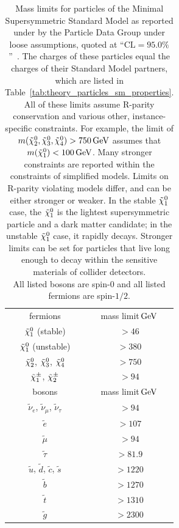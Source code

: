\begin{table}[tp]
\centering
\begin{tabular}{cc}
fermions                                        & mass limit$\,\eV[G]$ \\[0.2em]
$\neutralino_1$ (stable)                        & $> 46$         \\
$\neutralino_1$ (unstable)                      & $> 380$        \\
$\neutralino_2$, $\neutralino_3$, $\neutralino_4$ & $> 750$        \\
$\chargino_1$, $\chargino_2$                     & $> 94$         \\[1em]
bosons                                          & mass limit$\,\eV[G]$ \\[0.2em]
$\tilde \nu_e$, $\tilde \nu_\mu$, $\tilde \nu_\tau$ & $> 94$       \\
$\tilde e$                                      & $> 107$        \\
$\tilde \mu$                                    & $> 94$         \\
$\tilde \tau$                                   & $> 81.9$       \\
$\tilde u$, $\tilde d$, $\tilde c$, $\tilde s$     & $> 1220$       \\
$\tilde b$                                      & $> 1270$       \\
$\tilde t$                                      & $> 1310$       \\
$\tilde g$                                      & $> 2300$
\end{tabular}
\caption[%
Mass limits for particles of the Minimal Supersymmetric Standard Model%
]{%
Mass limits for particles of the Minimal Supersymmetric Standard Model as
reported under by the Particle Data Group under loose
assumptions, quoted at ``$\mathrm{CL}=95.0\%$''~\cite{pdg2022ynf}.
The charges of these particles equal the charges of their Standard Model
partners, which are listed in
Table~\ref{tab:theory_particles_sm_properties}.
\\[0.4em]
All of these limits assume R-parity conservation and various other,
instance-specific constraints.
For example, the limit of
$m(\neutralino_2,\neutralino_3,\neutralino_4) > 750\,\eV[G]$
assumes that $m(\neutralino_1) < 100\,\eV[G]$.
Many stronger constraints are reported within the constraints of simplified
models.
Limits on R-parity violating models differ, and can be either stronger or
weaker.
In the stable $\neutralino_1$ case, the $\neutralino_1$ is the lightest
supersymmetric particle and a dark matter candidate;
in the unstable $\neutralino_1$ case, it rapidly decays.
Stronger limits can be set for particles that live long enough to decay within
the sensitive materials of collider detectors.
\\[0.4em]
All listed bosons are spin-$0$ and all listed fermions are spin-$1/2$.
}
\label{tab:theory_particles_mssm_mass_limits}
\end{table}

